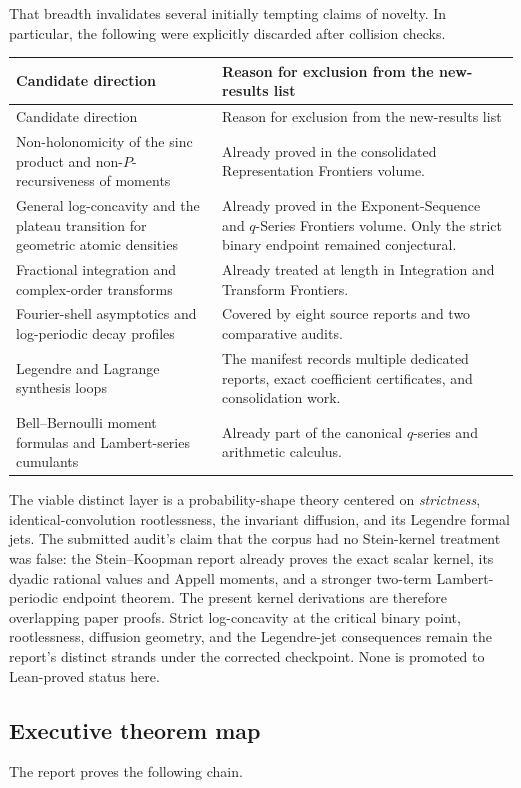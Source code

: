 \documentclass[11pt,oneside]{article}
\theoremstyle{definition}
\theoremstyle{remark}
\begin{document}
That breadth invalidates several initially tempting claims of novelty.  In
particular, the following were explicitly discarded after collision checks.

\begin{longtable}{p{}p{}}
\toprule
Candidate direction & Reason for exclusion from the new-results list\\
\midrule
\endfirsthead
\toprule
Candidate direction & Reason for exclusion from the new-results list\\
\midrule
\endhead
Non-holonomicity of the sinc product and non-$P$-recursiveness of moments & Already proved in the consolidated Representation Frontiers volume.\\
General log-concavity and the plateau transition for geometric atomic densities & Already proved in the Exponent-Sequence and $q$-Series Frontiers volume.  Only the strict binary endpoint remained conjectural.\\
Fractional integration and complex-order transforms & Already treated at length in Integration and Transform Frontiers.\\
Fourier-shell asymptotics and log-periodic decay profiles & Covered by eight source reports and two comparative audits.\\
Legendre and Lagrange synthesis loops & The manifest records multiple dedicated reports, exact coefficient certificates, and consolidation work.\\
Bell--Bernoulli moment formulas and Lambert-series cumulants & Already part of the canonical $q$-series and arithmetic calculus.\\
\bottomrule
\end{longtable}

The viable distinct layer is a probability-shape theory centered on
\emph{strictness}, identical-convolution rootlessness, the invariant diffusion,
and its Legendre formal jets.  The submitted audit's claim that the corpus had no
Stein-kernel treatment was false: the Stein--Koopman report already proves the
exact scalar kernel, its dyadic rational values and Appell moments, and a stronger
two-term Lambert-periodic endpoint theorem.  The present kernel derivations are
therefore overlapping paper proofs.  Strict log-concavity at the critical binary
point, rootlessness, diffusion geometry, and the Legendre-jet consequences remain
the report's distinct strands under the corrected checkpoint.  None is promoted
to Lean-proved status here.

\subsection{Executive theorem map}
The report proves the following chain.
\end{document}
